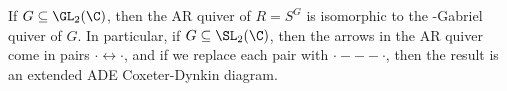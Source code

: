 \begin{cor}
If $G \subseteq \GL_2(\C)$, then the AR quiver of $R= S^G$ is isomorphic to the \mc-Gabriel quiver of $G$. In particular, if $G \subseteq \SL_2(\C)$, then the arrows in the AR quiver come in pairs $\cdot \leftrightarrow \cdot$, and if we replace each pair with $\cdot --- \cdot$, then the result is an extended ADE Coxeter-Dynkin diagram.
\end{cor}























